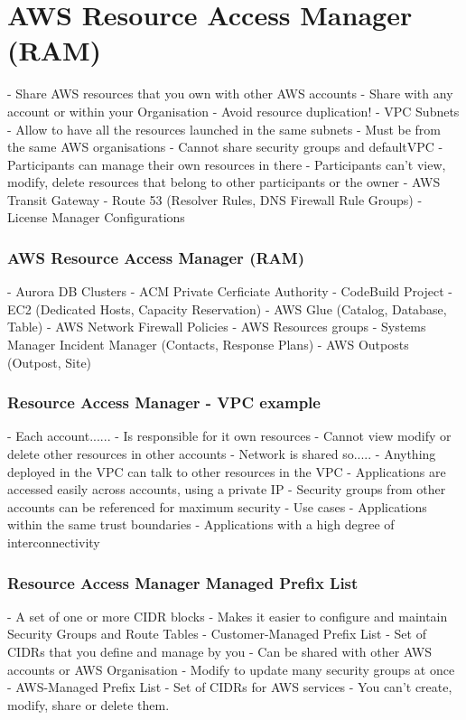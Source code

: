 \documentclass[11pt]{book}
\begin{document}
    \section{AWS Resource Access Manager (RAM)}
    - Share AWS resources that you own with other AWS accounts
    - Share with any account or within your Organisation
    - Avoid resource duplication!
    - VPC Subnets
    - Allow to have all the resources launched in the same subnets
    - Must be from the same AWS organisations
    - Cannot share security groups and defaultVPC
    - Participants can manage their own resources in there
    - Participants can't view, modify, delete resources that belong to other participants or the owner
    - AWS Transit Gateway
    - Route 53 (Resolver Rules, DNS Firewall Rule Groups)
    - License Manager Configurations

    \subsubsection{AWS Resource Access Manager (RAM)}
    - Aurora DB Clusters
    - ACM Private Cerficiate Authority
    - CodeBuild Project
    - EC2 (Dedicated Hosts, Capacity Reservation)
    - AWS Glue (Catalog, Database, Table)
    - AWS Network Firewall Policies
    - AWS Resources groups
    - Systems Manager Incident Manager (Contacts, Response Plans)
    - AWS Outposts (Outpost, Site)

    \subsubsection{Resource Access Manager - VPC example}
    - Each account......
    - Is responsible for it own resources
    - Cannot view modify or delete other resources in other accounts
    - Network is shared so.....
    - Anything deployed in the VPC can talk to other resources in the VPC
    - Applications are accessed easily across accounts, using a private IP
    - Security groups from other accounts can be referenced for maximum security
    - Use cases
    - Applications within the same trust boundaries
    - Applications with a high degree of interconnectivity

    \subsubsection{Resource Access Manager Managed Prefix List}
    - A set of one or more CIDR blocks
    - Makes it easier to configure and maintain Security Groups and Route Tables
    - Customer-Managed Prefix List
    - Set of CIDRs that you define and manage by you
    - Can be shared with other AWS accounts or AWS Organisation
    - Modify to update many security groups at once
    - AWS-Managed Prefix List
    - Set of CIDRs for AWS services
    - You can't create, modify, share or delete them.
\end{document}
